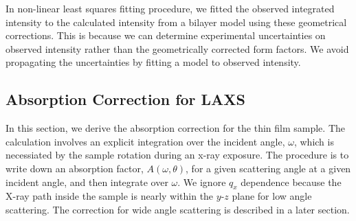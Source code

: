 In non-linear least squares fitting procedure, 
we fitted the observed integrated intensity to
the calculated intensity from a bilayer model using these geometrical corrections. 
This is because we can determine experimental uncertainties
on observed intensity rather than the geometrically corrected form factors. 
We avoid propagating the uncertainties by fitting a model to observed intensity. 

\subsection{Absorption Correction for LAXS}
In this section, we derive the absorption correction for the thin film
sample. The calculation involves an explicit integration over the incident angle, 
$\omega$, which is necessiated by the sample rotation during an x-ray exposure. 
The procedure is to write down an absorption factor, $A(\omega,\theta)$, for a 
given scattering angle at a given incident angle, and
then integrate over $\omega$. We ignore $q_x$ dependence because the X-ray
path inside the sample is nearly within the $y$-$z$ plane for low angle
scattering. The correction for wide angle scattering is described in a later
section.

